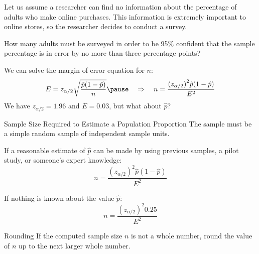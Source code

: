 \documentclass{beamer}
\begin{document}
\begin{frame}
\begin{example}\label{ex:online}
Let us assume a researcher can find no information about the percentage of adults who make online purchases. This information is extremely important to online stores, so the researcher decides to conduct a survey.\pause

\vspace{1mm}
How many adults must be surveyed in order to be 95\% confident that the sample percentage is in error by no more than three percentage points?\pause

\vspace{1mm}
We can solve the margin of error equation for $n$:
\begin{equation*}
E=z_{\alpha/2}\sqrt{\dfrac{\hat{p}(1-\hat{p})}{n}} \pause
\quad\Rightarrow\quad
n=\dfrac{ {(z_{\alpha/2})}^2 \hat{p} (1-\hat{p}) }{E^2}
\end{equation*}\pause
We have $z_{\alpha/2}=1.96$ and $E=0.03$, but what about $\hat{p}$?
\end{example}
\end{frame}

\begin{frame}
\begin{block}{Sample Size Required to Estimate a Population Proportion}
The sample must be a simple random sample of independent sample units.\pause

\vspace{2mm}
If a reasonable estimate of $\hat{p}$ can be made by using previous samples, a pilot study, or someone's expert knowledge:
\begin{equation*}
n=\dfrac{ {(z_{\alpha/2})}^2 \hat{p} (1-\hat{p}) }{E^2}
\end{equation*}\pause

\vspace{-3mm}
If nothing is known about the value $\hat{p}$:
\begin{equation*}
n=\dfrac{ {(z_{\alpha/2})}^2 0.25 }{E^2}
\end{equation*}
\end{block}\pause

\begin{block}{Rounding}
If the computed sample size $n$ is not a whole number, round the value of $n$ up to the next larger whole number.
\end{block}
\end{frame}
\end{document}
